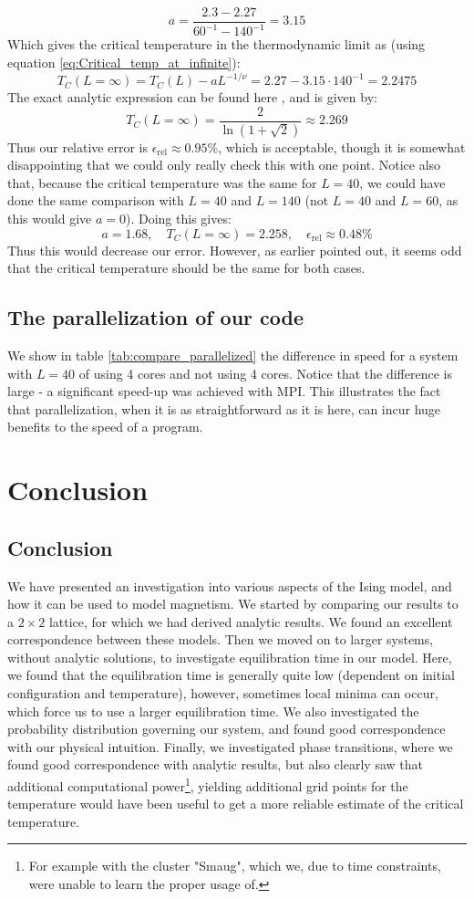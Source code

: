 \documentclass[a4paper, 10pt]{article}
\begin{document}
$$a=\frac{2.3-2.27}{60^{-1}-140^{-1}}=3.15$$
Which gives the critical temperature in the thermodynamic limit as (using equation \ref{eq:Critical_temp_at_infinite}):
$$T_C(L=\infty)=T_C(L)-aL^{-1/\nu}=2.27-3.15\cdot 140^{-1}=2.2475$$
The exact analytic expression can be found here \cite{Project}, and is given by:
$$T_C(L=\infty)=\frac{2}{\ln(1+\sqrt{2})}\approx2.269$$
Thus our relative error is $\epsilon_{\mathrm{rel}}\approx 0.95 \%$, which is acceptable, though it is somewhat disappointing that we could only really check this with one point. Notice also that, because the critical temperature was the same for $L=40$, we could have done the same comparison with $L=40$ and $L=140$ (not $L=40$ and $L=60$, as this would give $a=0$). Doing this gives:
$$a=1.68, \quad T_C(L=\infty)=2.258, \quad \epsilon_{\mathrm{rel}}\approx 0.48 \%$$
Thus this would decrease our error. However, as earlier pointed out, it seems odd that the critical temperature should be the same for both cases.
\subsection{The parallelization of our code}
We show in table \ref{tab:compare_parallelized} the difference in speed for a system with $L=40$ of using 4 cores and not using 4 cores. Notice that the difference is large - a significant speed-up was achieved with MPI. This illustrates the fact that parallelization, when it is as straightforward as it is here, can incur huge benefits to the speed of a program.
\clearpage
\section{Conclusion}
\subsection{Conclusion}
We have presented an investigation into various aspects of the Ising model, and how it can be used to model magnetism. We started by comparing our results to a $2\times 2$ lattice, for which we had derived analytic results. We found an excellent correspondence between these models. Then we moved on to larger systems, without analytic solutions, to investigate equilibration time in our model. Here, we found that the equilibration time is generally quite low (dependent on initial configuration and temperature), however, sometimes local minima can occur, which force us to use a larger equilibration time. We also investigated the probability distribution governing our system, and found good correspondence with our physical intuition. Finally, we investigated phase transitions, where we found good correspondence with analytic results, but also clearly saw that additional computational power\footnote{For example with the cluster "Smaug", which we, due to time constraints, were unable to learn the proper usage of.}, yielding additional grid points for the temperature would have been useful to get a more reliable estimate of the critical temperature.
\end{document}
